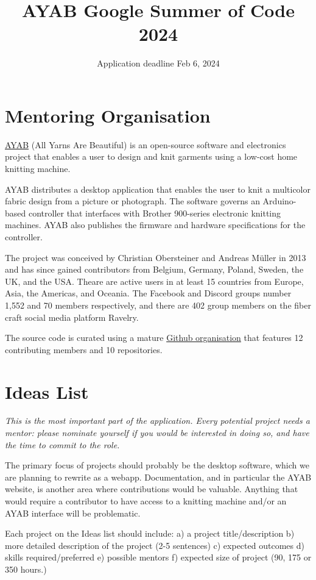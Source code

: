 \documentclass{article}
\title{AYAB Google Summer of Code 2024}
\author{Application deadline Feb 6, 2024}
\begin{document}
\maketitle

\section{Mentoring Organisation}

\href{https://ayab-knitting.com/}{AYAB} (All Yarns Are Beautiful) is an open-source software and electronics project that enables a user to design and knit garments using a low-cost home knitting machine. 

AYAB distributes a desktop application that enables the user to knit a multicolor fabric design from a picture or photograph. The software governs an Arduino-based controller that interfaces with Brother 900-series electronic knitting machines. AYAB also publishes the firmware and hardware specifications for the controller.

The project was conceived by Christian Obersteiner and Andreas M{\"u}ller in 2013 and has since gained contributors from Belgium, Germany, Poland, Sweden, the UK, and the USA. Theare are active users in at least 15 countries from Europe, Asia, the Americas, and Oceania. The Facebook and Discord groups number 1,552 and 70 members respectively, and there are 402 group members on the fiber craft social media platform Ravelry.

The source code is curated using a mature \href{https://github.com/AllYarnsAreBeautiful}{Github organisation} that features 12 contributing members and 10 repositories.

\section{Ideas List}

{\itshape
This is the most important part of the application. Every potential project needs a mentor: please nominate yourself if you would be interested in doing so, and have the time to commit to the role.

The primary focus of projects should probably be the desktop software, which we are planning to rewrite as a webapp. Documentation, and in particular the AYAB website, is another area where contributions would be valuable. Anything that would require a contributor to have access to a knitting machine and/or an AYAB interface will be problematic.

Each project on the Ideas list should include: a) a project title/description b) more detailed description of the project (2-5 sentences) c) expected outcomes d) skills required/preferred e) possible mentors f) expected size of project (90, 175 or 350 hours.)
}
\end{document}
